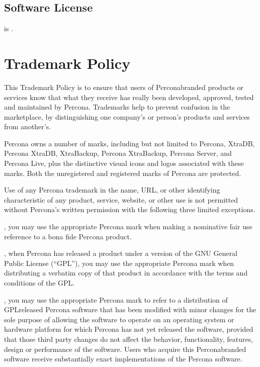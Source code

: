 \documentclass[letterpaper,10pt,english]{sphinxmanual}
\begin{document}
\section{Software License}
\label{\detokenize{copyright:software-license}}
\sphinxAtStartPar
{} is .


\chapter{Trademark Policy}
\label{\detokenize{trademark-policy:trademark-policy}}\label{\detokenize{trademark-policy::doc}}
\sphinxAtStartPar
This Trademark Policy is to ensure that users of Percona\sphinxhyphen{}branded products or
services know that what they receive has really been developed, approved,
tested and maintained by Percona. Trademarks help to prevent confusion in the
marketplace, by distinguishing one company’s or person’s products and services
from another’s.

\sphinxAtStartPar
Percona owns a number of marks, including but not limited to Percona, XtraDB,
Percona XtraDB, XtraBackup, Percona XtraBackup, Percona Server, and Percona
Live, plus the distinctive visual icons and logos associated with these marks.
Both the unregistered and registered marks of Percona are protected.

\sphinxAtStartPar
Use of any Percona trademark in the name, URL, or other identifying
characteristic of any product, service, website, or other use is not permitted
without Percona’s written permission with the following three limited
exceptions.

\sphinxAtStartPar
{}, you may use the appropriate Percona mark when making a nominative fair
use reference to a bona fide Percona product.

\sphinxAtStartPar
{}, when Percona has released a product under a version of the GNU
General Public License (“GPL”), you may use the appropriate Percona mark when
distributing a verbatim copy of that product in accordance with the terms and
conditions of the GPL.

\sphinxAtStartPar
{}, you may use the appropriate Percona mark to refer to a distribution of
GPL\sphinxhyphen{}released Percona software that has been modified with minor changes for
the sole purpose of allowing the software to operate on an operating system or
hardware platform for which Percona has not yet released the software, provided
that those third party changes do not affect the behavior, functionality,
features, design or performance of the software. Users who acquire this
Percona\sphinxhyphen{}branded software receive substantially exact implementations of the
Percona software.
\end{document}
